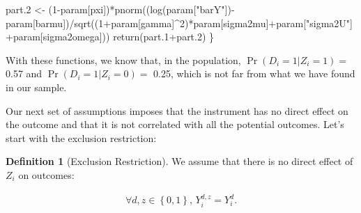 \documentclass[
]{book}
\newenvironment{Shaded}{\begin{snugshade}}{\end{snugshade}}
\newcommand{\DecValTok}[1]{\textcolor[rgb]{0.00,0.00,0.81}{#1}}
\newcommand{\FloatTok}[1]{\textcolor[rgb]{0.00,0.00,0.81}{#1}}
\newcommand{\FunctionTok}[1]{\textcolor[rgb]{0.00,0.00,0.00}{#1}}
\newcommand{\NormalTok}[1]{#1}
\newcommand{\OtherTok}[1]{\textcolor[rgb]{0.56,0.35,0.01}{#1}}
\newcommand{\SpecialCharTok}[1]{\textcolor[rgb]{0.00,0.00,0.00}{#1}}
\newcommand{\StringTok}[1]{\textcolor[rgb]{0.31,0.60,0.02}{#1}}
\theoremstyle{definition}
\newtheorem{definition}{Definition}[chapter]
\theoremstyle{definition}
\theoremstyle{definition}
\theoremstyle{definition}
\theoremstyle{remark}
\begin{document}
\begin{Shaded}
\begin{Highlighting}[]
\NormalTok{  part}\FloatTok{.2} \OtherTok{\textless{}{-}}\NormalTok{ (}\DecValTok{1}\SpecialCharTok{{-}}\NormalTok{param[}\StringTok{\textquotesingle{}pxi\textquotesingle{}}\NormalTok{])}\SpecialCharTok{*}\FunctionTok{pnorm}\NormalTok{((}\FunctionTok{log}\NormalTok{(param[}\StringTok{"barY"}\NormalTok{])}\SpecialCharTok{{-}}\NormalTok{param[}\StringTok{\textquotesingle{}barmu\textquotesingle{}}\NormalTok{])}\SpecialCharTok{/}\FunctionTok{sqrt}\NormalTok{((}\DecValTok{1}\SpecialCharTok{+}\NormalTok{param[}\StringTok{\textquotesingle{}gamma\textquotesingle{}}\NormalTok{]}\SpecialCharTok{\^{}}\DecValTok{2}\NormalTok{)}\SpecialCharTok{*}\NormalTok{param[}\StringTok{\textquotesingle{}sigma2mu\textquotesingle{}}\NormalTok{]}\SpecialCharTok{+}\NormalTok{param[}\StringTok{"sigma2U"}\NormalTok{]}\SpecialCharTok{+}\NormalTok{param[}\StringTok{\textquotesingle{}sigma2omega\textquotesingle{}}\NormalTok{]))}
  \FunctionTok{return}\NormalTok{(part}\FloatTok{.1}\SpecialCharTok{+}\NormalTok{part}\FloatTok{.2}\NormalTok{)}
\NormalTok{\}}
\end{Highlighting}
\end{Shaded}

With these functions, we know that, in the population, \(\Pr(D_i=1|Z_i=1)=\) 0.57 and \(\Pr(D_i=1|Z_i=0)=\) 0.25, which is not far from what we have found in our sample.

Our next set of assumptions imposes that the instrument has no direct effect on the outcome and that it is not correlated with all the potential outcomes.
Let's start with the exclusion restriction:

\begin{definition}[Exclusion Restriction]
\protect\hypertarget{def:ExclusionRestriction}{}{\label{def:ExclusionRestriction} \iffalse (Exclusion Restriction) \fi{} }We assume that there is no direct effect of \(Z_i\) on outcomes:

\begin{align*}
\forall d,z \in \left\{0,1\right\}\text{, } Y_i^{d,z} = Y_i^d.
\end{align*}
\end{definition}
\end{document}
